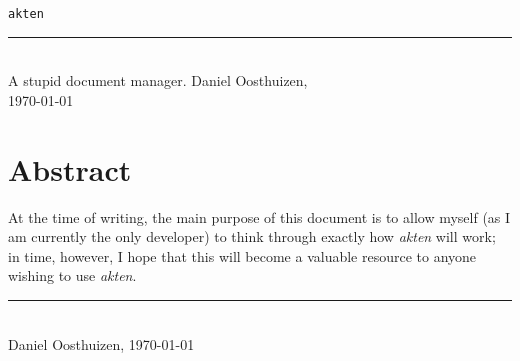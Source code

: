 \documentclass[a4paper]{article}
\begin{document}
\begin{titlepage}
  \centering
  \vspace{1in}
  \texttt{\Huge akten}\\
  \rule{4in}{0.4pt}\\
  \vspace{1in}
  {\Large A stupid document manager.}
  \vfill
  \raggedleft
  {\large Daniel Oosthuizen,\\
  \today}
\end{titlepage}


\section*{Abstract}
\label{sec:Abstract}

At the time of writing, the main purpose of this document is to allow myself
(as I am currently the only developer) to think through exactly how \emph{akten}
will work; in time, however, I hope that this will become a valuable resource
to anyone wishing to use \emph{akten}.

\begin{flushright}
  \rule{1in}{0.4pt}\\
  Daniel Oosthuizen, \today
\end{flushright}

\cleardoublepage
\pagestyle{empty}
\tableofcontents
\cleardoublepage

\setcounter{page}{1}
\end{document}
